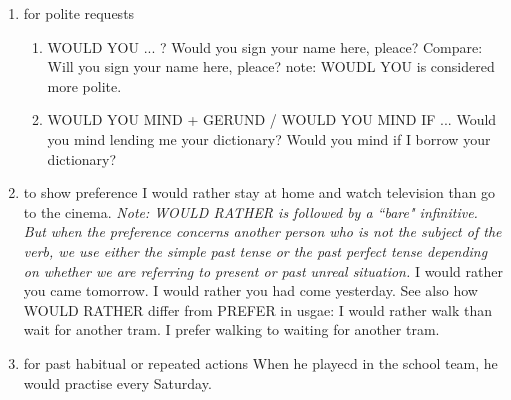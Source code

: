 \begin{enumerate}
\begin{enumerate}
            \item for polite requests
                \begin{enumerate}
                    \item WOULD YOU ... ?
                        \newline
                        Would you sign your name here, pleace?
                        \newline
                        Compare: Will you sign your name here, pleace?
                        \newline
                        note: WOUDL YOU is considered more polite.
                    \item WOULD YOU MIND + GERUND / WOULD  YOU MIND IF ...
                        \newline
                        Would you mind lending me your dictionary?
                        \newline
                        Would you mind if I borrow your dictionary?
                \end{enumerate}
            \item to show preference
                \newline
                I would rather stay at home and watch television than go to the
                cinema.
                \newline
                \newline
                {\it Note: WOULD RATHER is followed by a ``bare" infinitive. But
                when the preference concerns another person who is not the
                subject of the verb, we use either the simple past tense or the
                past perfect tense depending on whether we are referring to
                present or past unreal situation.}
                \newline
                I would rather you came tomorrow.
                \newline
                I would rather you had come yesterday.
                \newline
                See also how WOULD RATHER differ from PREFER in usgae:
                \newline
                I would rather walk than wait for another tram.
                \newline
                I prefer walking to waiting for another tram.
            \item for past habitual or repeated actions
                \newline
                When he playecd in the school team, he would practise every
                Saturday.
        \end{enumerate}
\end{enumerate}
